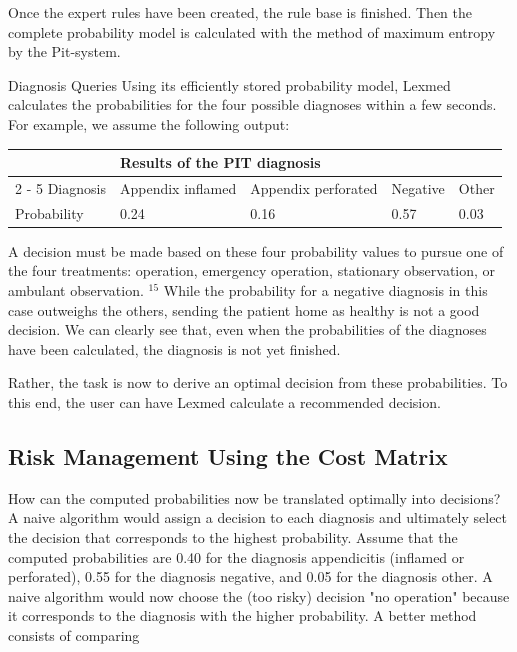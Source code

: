 \documentclass[10pt]{book}
\begin{document}
Once the expert rules have been created, the rule base is finished. Then the complete probability model is calculated with the method of maximum entropy by the Pit-system.

Diagnosis Queries
Using its efficiently stored probability model, Lexmed calculates the probabilities for the four possible diagnoses within a few seconds. For example, we assume the following output:

\begin{center}
\begin{tabular}{lllll}
\hline
 & \multicolumn{4}{l}{Results of the PIT diagnosis} \\
\cline { 2 - 5 }
Diagnosis & Appendix inflamed & Appendix perforated & Negative & Other \\
\hline
Probability & 0.24 & 0.16 & 0.57 & 0.03 \\
\hline
\end{tabular}
\end{center}

A decision must be made based on these four probability values to pursue one of the four treatments: operation, emergency operation, stationary observation, or ambulant observation. ${ }^{15}$ While the probability for a negative diagnosis in this case outweighs the others, sending the patient home as healthy is not a good decision. We can clearly see that, even when the probabilities of the diagnoses have been calculated, the diagnosis is not yet finished.

Rather, the task is now to derive an optimal decision from these probabilities. To this end, the user can have Lexmed calculate a recommended decision.

\subsection{Risk Management Using the Cost Matrix}
How can the computed probabilities now be translated optimally into decisions? A naive algorithm would assign a decision to each diagnosis and ultimately select the decision that corresponds to the highest probability. Assume that the computed probabilities are 0.40 for the diagnosis appendicitis (inflamed or perforated), 0.55 for the diagnosis negative, and 0.05 for the diagnosis other. A naive algorithm would now choose the (too risky) decision "no operation" because it corresponds to the diagnosis with the higher probability. A better method consists of comparing
\end{document}

